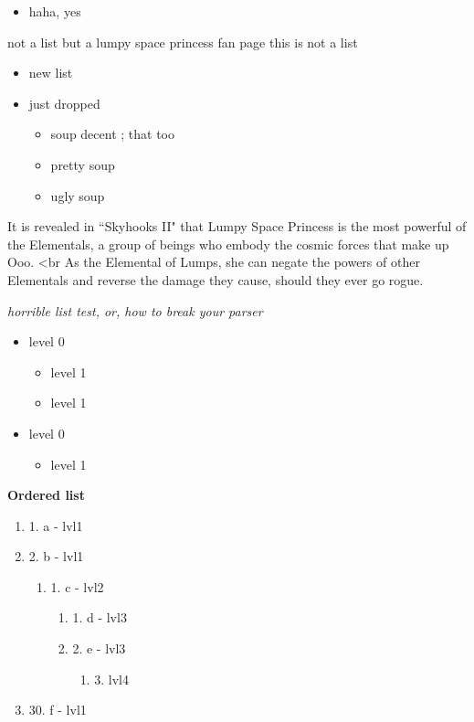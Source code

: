 \begin{itemize}
\item haha, yes 

\end{itemize}

not a list but a lumpy space princess fan page
this is not a list



\begin{itemize}
\item new list
\item just dropped
\begin{itemize} 
 \item soup decent ; that too
\item pretty soup
\item ugly soup 
\end{itemize}

\end{itemize}

It is revealed in ``Skyhooks II" that Lumpy Space Princess is the most powerful of the Elementals, a group of beings who embody the cosmic forces that make up Ooo. <br As the Elemental of Lumps, she can negate the powers of other Elementals and reverse the damage they cause, should they ever go rogue.


\textit{horrible list test, or, how to break your parser}



\begin{itemize}
\item level 0
\begin{itemize} 
 \item level 1
\item level 1
\end{itemize}
\item level 0
\begin{itemize} 
 \item level 1 
\end{itemize}

\end{itemize}


\textbf{Ordered list}



   \begin{enumerate}
   \item 1. a - lvl1
\item 2. b - lvl1
\begin{enumerate} 
 \item 1. c - lvl2 
\begin{enumerate} 
 \item 1. d - lvl3 
\item 2. e - lvl3
\begin{enumerate} 
 \item 3. lvl4
\end{enumerate}
\end{enumerate}
\end{enumerate}
\item 30. f - lvl1 

   \end{enumerate}


